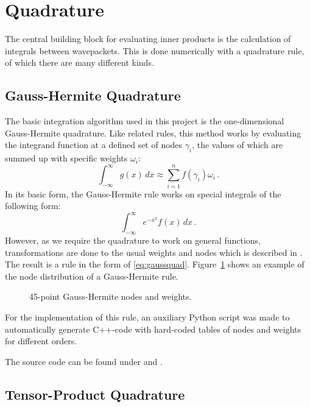 \section{Quadrature}

The central building block for evaluating inner products is the calculation of
integrals between wavepackets.
This is done numerically with a quadrature rule, of which there are many
different kinds.


\subsection{Gauss-Hermite Quadrature}
\label{subsec:ghquad}

The basic integration algorithm used in this project is the one-dimensional
Gauss-Hermite quadrature.
Like related rules, this method works by evaluating the integrand function at a
defined set of nodes $\gamma_i$, the values of which are summed up with specific
weights $\omega_i$:
\begin{equation}
  \label{eq:gaussquad}
  \int_{-\infty}^{\infty} g(x) \, dx \approx \sum_{i=1}^{n} f(\gamma_i) \omega_i \,.
\end{equation}
In its basic form, the Gauss-Hermite rule works on special integrals of the
following form:
\begin{equation}
  \int_{-\infty}^{\infty} e^{-x^2} f(x) \, dx \,.
\end{equation}
However, as we require the quadrature to work on general functions,
transformations are done to the usual weights and nodes which is described in
\cite{B_master_thesis}.
The result is a rule in the form of \eqref{eq:gaussquad}.
Figure~\ref{fig:ghexample} shows an example of the node distribution of a
Gauss-Hermite rule.

\begin{figure}
  \center
  
  \caption{45-point Gauss-Hermite nodes and weights.}
  \label{fig:ghexample}
\end{figure}

For the implementation of this rule, an auxiliary Python script was made to
automatically generate C++-code with hard-coded tables of nodes and weights for
different orders.

The source code can be found under  and
.


\subsection{Tensor-Product Quadrature}
\label{subsec:tpquad}

